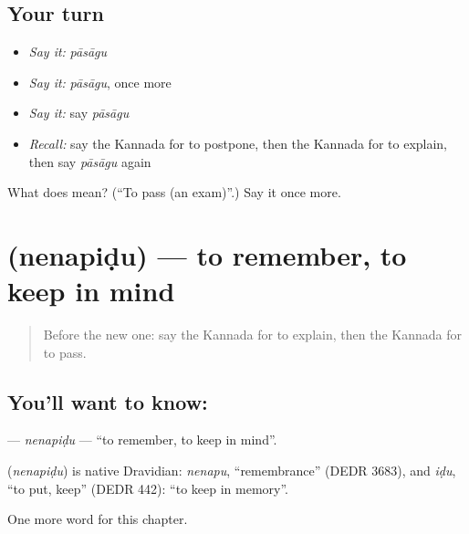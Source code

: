 \subsection*{Your turn}
\begin{itemize}
\raggedright
  \item \emph{Say it:} \emph{pāsāgu}
  \item \emph{Say it:} \emph{pāsāgu}, once more
  \item \emph{Say it:} say \emph{pāsāgu}
  \item \emph{Recall:} say the Kannada for to postpone, then the Kannada for to explain, then say \emph{pāsāgu} again
\end{itemize}

\begin{tcolorbox}[breakable,colback=teal!4,colframe=teal!35!black,title={Before you move on}]
What does  mean? (\textquotedblleft{}To pass (an exam)\textquotedblright{}.) Say it once more.
\end{tcolorbox}
\section[\texorpdfstring{\kn{ನೆನಪಿಡು} (nenapiḍu)}{ನೆನಪಿಡು (nenapiḍu)}]{ (nenapiḍu) — to remember, to keep in mind}

\label{lesson:KA-C201-nenapidu}



\begin{quote}
Before the new one: say the Kannada for to explain, then the Kannada for to pass.
\end{quote}

\subsection*{You'll want to know: }
\textbf{} — \emph{nenapiḍu} — \textquotedblleft{}to remember, to keep in mind\textquotedblright{}.

\begin{cousinweb}
\textbf{} (\emph{nenapiḍu}) is native Dravidian: \emph{nenapu}, \textquotedblleft{}remembrance\textquotedblright{} (DEDR 3683), and \emph{iḍu}, \textquotedblleft{}to put, keep\textquotedblright{} (DEDR 442): \textquotedblleft{}to keep in memory\textquotedblright{}.
\end{cousinweb}

\begin{grammarlens}[title={What you've built}]
One more word for this chapter.
\end{grammarlens}

